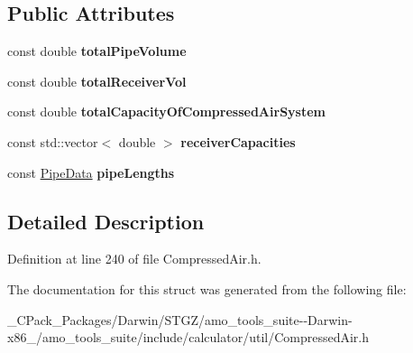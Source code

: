 \subsection*{Public Attributes}
\begin{DoxyCompactItemize}
\item 
\mbox{\label{struct_compressor_1_1_air_system_capacity_1_1_output_aa6eebf63d38ed5cb2943e6ef0d00d326}} 
const double {\bfseries total\+Pipe\+Volume}
\item 
\mbox{\label{struct_compressor_1_1_air_system_capacity_1_1_output_a442171a72537e1c9057f03db3f08a39a}} 
const double {\bfseries total\+Receiver\+Vol}
\item 
\mbox{\label{struct_compressor_1_1_air_system_capacity_1_1_output_a9f81c36e0dfea5574d2e6279b928e288}} 
const double {\bfseries total\+Capacity\+Of\+Compressed\+Air\+System}
\item 
\mbox{\label{struct_compressor_1_1_air_system_capacity_1_1_output_a4636965433b7e3c0fa5ef6d2a69a32ba}} 
const std\+::vector$<$ double $>$ {\bfseries receiver\+Capacities}
\item 
\mbox{\label{struct_compressor_1_1_air_system_capacity_1_1_output_a1a2fe0406a4ff682d7141df7b5e4b150}} 
const \hyperlink{struct_compressor_1_1_pipe_data}{Pipe\+Data} {\bfseries pipe\+Lengths}
\end{DoxyCompactItemize}


\subsection{Detailed Description}


Definition at line 240 of file Compressed\+Air.\+h.



The documentation for this struct was generated from the following file\+:\begin{DoxyCompactItemize}
\item 
\+\_\+\+C\+Pack\+\_\+\+Packages/\+Darwin/\+S\+T\+G\+Z/amo\+\_\+tools\+\_\+suite-\/-\/\+Darwin-\/x86\+\_/amo\+\_\+tools\+\_\+suite/include/calculator/util/Compressed\+Air.\+h\end{DoxyCompactItemize}
